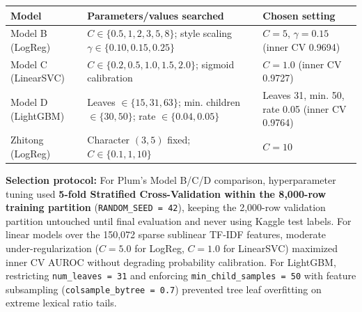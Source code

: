\documentclass[11pt,letterpaper]{article}
\begin{document}
\begin{tabularx}{\linewidth}{@{}p{1.18in}Yp{1.38in}@{}}\toprule Model & Parameters/values searched & Chosen setting \\ \midrule
Model B (LogReg) & $C\in\{0.5,1,2,3,5,8\}$; style scaling $\gamma\in\{0.10,0.15,0.25\}$ & $C=5$, $\gamma=0.15$ (inner CV 0.9694) \\
Model C (LinearSVC) & $C\in\{0.2,0.5,1.0,1.5,2.0\}$; sigmoid calibration & $C=1.0$ (inner CV 0.9727) \\
Model D (LightGBM) & Leaves $\in\{15,31,63\}$; min. children $\in\{30,50\}$; rate $\in\{0.04,0.05\}$ & Leaves 31, min. 50, rate 0.05 (inner CV 0.9764) \\
Zhitong (LogReg) & Character $(3,5)$ fixed; $C\in\{0.1,1,10\}$ & $C=10$ \\
\bottomrule\end{tabularx}
\textbf{Selection protocol:} For Plum's Model B/C/D comparison, hyperparameter tuning used \textbf{5-fold Stratified Cross-Validation within the 8,000-row training partition} (\texttt{RANDOM\_SEED = 42}), keeping the 2,000-row validation partition untouched until final evaluation and never using Kaggle test labels. For linear models over the 150,072 sparse sublinear TF-IDF features, moderate under-regularization ($C=5.0$ for LogReg, $C=1.0$ for LinearSVC) maximized inner CV AUROC without degrading probability calibration. For LightGBM, restricting \texttt{num\_leaves = 31} and enforcing \texttt{min\_child\_samples = 50} with feature subsampling (\texttt{colsample\_bytree = 0.7}) prevented tree leaf overfitting on extreme lexical ratio tails.
\end{document}
